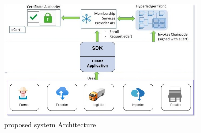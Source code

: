 \begin{figure}[htbp]
    \centering
    \includegraphics[width=0.9\textwidth]{Chapters/Chapter_5/figures/proposed_system.png}
    \caption{proposed system Architecture }
    \label{fig:figure5_6}
    \end{figure}
